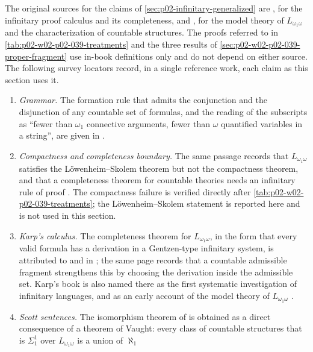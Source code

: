 The original sources for the claims of \cref{sec:p02-infinitary-generalized}
are \textcite{Karp1964}, for the infinitary proof calculus and its
completeness, and \textcite{Scott1965}, for the model theory of
\(L_{\omega_1\omega}\) and the characterization of countable structures.
The proofs referred to in \cref{tab:p02-w02-p02-039-treatments} and the
three results of \cref{sec:p02-w02-p02-039-proper-fragment} use in-book
definitions only and do not depend on either source.  The following
survey locators record, in a single reference work, each claim as this
section uses it.
\begin{enumerate}
\item \emph{Grammar.}  The formation rule that admits the conjunction and
      the disjunction of any countable set of formulas, and the reading of
      the subscripts as ``fewer than \(\omega_1\) connective arguments,
      fewer than \(\omega\) quantified variables in a string'', are given in
      \cite[ch.~A.1, \S5.4, pp.~43--44]{Barwise1977FirstOrder}.
\item \emph{Compactness and completeness boundary.}  The same passage
      records that \(L_{\omega_1\omega}\) satisfies the L\"owenheim--Skolem
      theorem but not the compactness theorem, and that a completeness
      theorem for countable theories needs an infinitary rule of proof
      \cite[ch.~A.1, \S5.4, p.~44]{Barwise1977FirstOrder}.  The
      compactness failure is verified directly after
      \cref{tab:p02-w02-p02-039-treatments}; the L\"owenheim--Skolem
      statement is reported here and is not used in this section.
\item \emph{Karp's calculus.}  The completeness theorem for
      \(L_{\omega_1\omega}\), in the form that every valid formula has a
      derivation in a Gentzen-type infinitary system, is attributed to
      \textcite{Karp1964} and \textcite{LopezEscobar1965} in
      \cite[ch.~A.7, \S1, p.~236]{Makkai1977}; the same page records
      that a countable admissible fragment strengthens this by choosing
      the derivation inside the admissible set.  Karp's book is also named
      there as the first systematic investigation of infinitary languages,
      and \textcite{Scott1965} as an early account of the model theory of
      \(L_{\omega_1\omega}\) \cite[ch.~A.7, \S1, p.~235]{Makkai1977}.
\item \emph{Scott sentences.}  The isomorphism theorem of
      \textcite{Scott1965} is obtained as a direct consequence of a
      theorem of Vaught: every class of countable structures that is
      \(\Sigma^1_1\) over \(L_{\omega_1\omega}\) is a union of \(\aleph_1\)

\end{enumerate}
